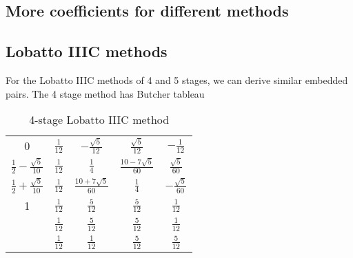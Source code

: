 \documentclass[10pt,a4paper]{article}
\newcommand{\half}[0]{\frac{1}{2}}
\begin{document}
\clearpage{}
\begin{appendix}
  \section{More coefficients for different methods}

  \subsection{Lobatto IIIC methods}
  For the Lobatto IIIC methods of 4 and 5 stages, we can derive similar embedded pairs.
  The 4 stage method has Butcher tableau
  \begin{table}[h]
    \centering
    \caption{4-stage Lobatto IIIC method}
      \def\arraystretch{1.5}%
  \begin{tabular}{c|cccc}
    0                             & $\frac{1}{12}$ & $-\frac{\sqrt{5}}{12}$ & $\frac{\sqrt{5}}{12}$ & $-\frac{1}{12}$ \\
    $\half - \frac{\sqrt{5}}{10}$ & $\frac{1}{12}$ & $\frac{1}{4}$ & $\frac{10-7\sqrt{5}}{60}$ & $\frac{\sqrt{5}}{60} $ \\
    $\half + \frac{\sqrt{5}}{10}$ & $\frac{1}{12}$ & $\frac{10+7\sqrt{5}}{60}$ & $\frac{1}{4}$ & $-\frac{\sqrt{5}}{60}$ \\
    1                             & $\frac{1}{12}$ & $\frac{5}{12}$ & $\frac{5}{12}$ & $\frac{1}{12}$ \\ \hline
    {} & $\frac{1}{12}$ & $\frac{5}{12}$ & $\frac{5}{12}$ & $\frac{1}{12}$ \\
    {} & $\frac{1}{12}$ & $\frac{1}{12}$ & $\frac{5}{12}$ & $\frac{5}{12}$ \\
  \end{tabular}
\end{table}


\end{appendix}
\end{document}
